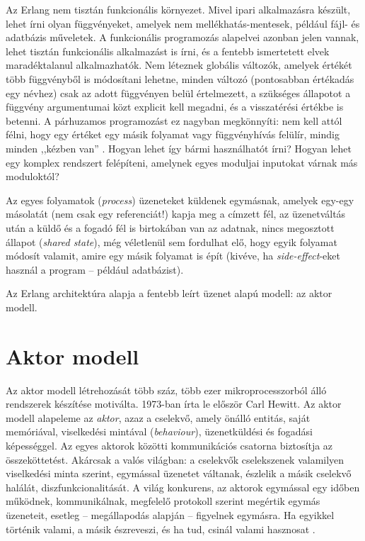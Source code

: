\documentclass[12pt, a4paper, oneside]{book}
\begin{document}
Az Erlang nem tisztán funkcionális környezet. Mivel ipari alkalmazásra készült,
lehet írni olyan függvényeket, amelyek nem mellékhatás-mentesek, például fájl-
és adatbázis műveletek. A funkcionális programozás alapelvei azonban jelen
vannak, lehet tisztán funkcionális alkalmazást is írni, és a fentebb
ismertetett elvek maradéktalanul alkalmazhatók. Nem léteznek globális változók,
amelyek értékét több függvényből is módosítani lehetne, minden változó
(pontosabban értékadás egy névhez) csak az adott függvényen belül értelmezett,
a szükséges állapotot a függvény argumentumai közt explicit kell megadni, és a
visszatérési értékbe is betenni. A párhuzamos programozást ez nagyban
megkönnyíti: nem kell attól félni, hogy egy értéket egy másik folyamat vagy
függvényhívás felülír, mindig minden ,,kézben van'' \citep{ArmstrongThesis}.
Hogyan lehet így bármi használhatót írni? Hogyan lehet egy komplex rendszert
felépíteni, amelynek egyes moduljai inputokat várnak más moduloktól?

Az egyes folyamatok (\emph{process}) üzeneteket küldenek egymásnak, amelyek
egy-egy másolatát (nem csak egy referenciát!) kapja meg a címzett fél, az
üzenetváltás után a küldő és a fogadó fél is birtokában van az adatnak, nincs
megosztott állapot (\emph{shared state}), még véletlenül sem fordulhat elő,
hogy egyik folyamat módosít valamit, amire egy másik folyamat is épít (kivéve,
ha \emph{side-effect}-eket használ a program -- például adatbázist).

Az Erlang architektúra alapja a fentebb leírt üzenet alapú modell: az aktor
modell.

\section{Aktor modell} 

Az aktor modell létrehozását több száz, több ezer mikroprocesszorból álló
rendszerek készítése motiválta. 1973-ban írta le először Carl Hewitt. Az aktor
modell alapeleme az \emph{aktor}, azaz a cselekvő, amely önálló entitás, saját
memóriával, viselkedési mintával (\emph{behaviour}), üzenetküldési és fogadási
képességgel. Az egyes aktorok közötti kommunikációs csatorna biztosítja az
összeköttetést. Akárcsak a valós világban: a cselekvők cselekszenek valamilyen
viselkedési minta szerint, egymással üzenetet váltanak, észlelik a másik
cselekvő halálát, diszfunkcionalitását. A világ konkurens, az aktorok egymással
egy időben működnek, kommunikálnak, megfelelő protokoll szerint megértik
egymás üzeneteit, esetleg -- megállapodás alapján -- figyelnek egymásra. Ha
egyikkel történik valami, a másik észreveszi, és ha tud, csinál valami
hasznosat \citep{Hewitt}.
\end{document}

